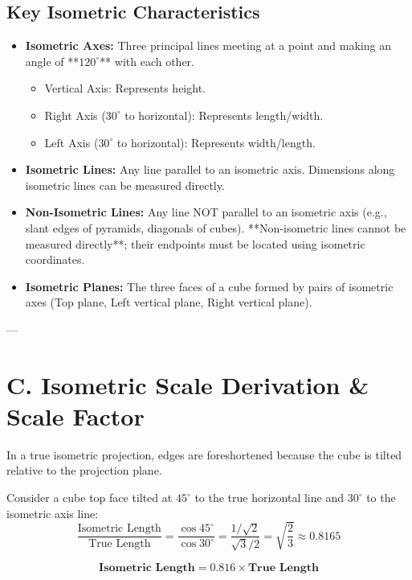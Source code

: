 \subsection{Key Isometric Characteristics}
\begin{itemize}
    \item \textbf{Isometric Axes:} Three principal lines meeting at a point and making an angle of **$120^\circ$** with each other.
    \begin{itemize}
        \item Vertical Axis: Represents height.
        \item Right Axis ($30^\circ$ to horizontal): Represents length/width.
        \item Left Axis ($30^\circ$ to horizontal): Represents width/length.
    \end{itemize}
    \item \textbf{Isometric Lines:} Any line parallel to an isometric axis. Dimensions along isometric lines can be measured directly.
    \item \textbf{Non-Isometric Lines:} Any line NOT parallel to an isometric axis (e.g., slant edges of pyramids, diagonals of cubes). **Non-isometric lines cannot be measured directly**; their endpoints must be located using isometric coordinates.
    \item \textbf{Isometric Planes:} The three faces of a cube formed by pairs of isometric axes (Top plane, Left vertical plane, Right vertical plane).
\end{itemize}

---

\section{C. Isometric Scale Derivation \& Scale Factor}

In a true isometric projection, edges are foreshortened because the cube is tilted relative to the projection plane.

\begin{keyequation}
Consider a cube top face tilted at $45^\circ$ to the true horizontal line and $30^\circ$ to the isometric axis line:
\begin{equation}
    \frac{\text{Isometric Length}}{\text{True Length}} = \frac{\cos 45^\circ}{\cos 30^\circ} = \frac{1/\sqrt{2}}{\sqrt{3}/2} = \sqrt{\frac{2}{3}} \approx \mathbf{0.8165}
\end{equation}

\begin{equation}
    \mathbf{\text{Isometric Length} = 0.816 \times \text{True Length}}
\end{equation}
\end{keyequation}

